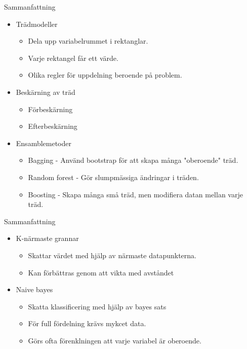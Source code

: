 \documentclass[10pt,english]{beamer}
\begin{document}
\begin{frame}{Sammanfattning}
    \begin{itemize}
        \item Trädmodeller
        \begin{itemize}
            \item Dela upp variabelrummet i rektanglar.
            \item Varje rektangel får ett värde.
            \item Olika regler för uppdelning beroende på problem.
        \end{itemize}
        \item Beskärning av träd
        \begin{itemize}
            \item Förbeskärning
            \item Efterbeskärning
        \end{itemize}
        \item Ensamblemetoder
        \begin{itemize}
            \item Bagging - Använd bootstrap för att skapa många "oberoende" träd.
            \item Random forest - Gör slumpmässiga ändringar i träden.
            \item Boosting - Skapa många små träd, men modifiera datan mellan varje träd.
        \end{itemize}
    \end{itemize}
\end{frame}

\begin{frame}{Sammanfattning}
    
    \begin{itemize}
        \item K-närmaste grannar
        \begin{itemize}
            \item Skattar värdet med hjälp av närmaste datapunkterna.
            \item Kan förbättras genom att vikta med avståndet
        \end{itemize}
        \item Naive bayes
        \begin{itemize}
            \item Skatta klassificering med hjälp av bayes sats
            \item För full fördelning krävs mykcet data.
            \item Görs ofta förenklningen att varje variabel är oberoende.
        \end{itemize}
    \end{itemize}

\end{frame}
\end{document}
